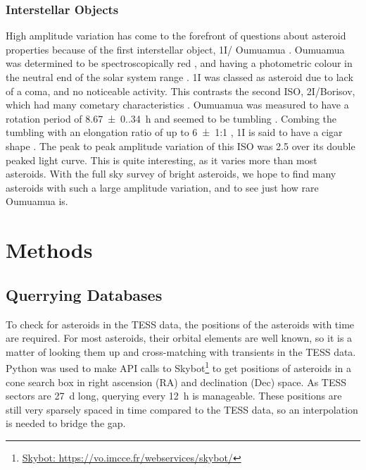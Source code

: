 \documentclass[12pt]{article}
\DeclareRobustCommand{\okina}{%
  \raisebox{\dimexpr\fontcharht\font`A-\height}{%
    \scalebox{0.8}{`}%
  }%
}
\newcommand{\omuamua}{\okina Oumuamua }
\begin{document}
\subsubsection*{Interstellar Objects}
High amplitude variation has come to the forefront of questions about asteroid properties because of the first interstellar object, 1I/\omuamua \citep[see][for a review]{Bannister2019}.
\omuamua was determined to be spectroscopically red \citep{Fitzsimmons2017, Meech2017}, and having a photometric colour in the neutral end of the solar system range \citep{Bannister2017}.
1I was classed as asteroid due to lack of a coma, and no noticeable activity.
This contrasts the second ISO, 2I/Borisov, which had many cometary characteristics \citep[see ][for a review]{Dorofeeva2023}. %
\omuamua was measured to have a rotation period of \qty{8.67(0.34)}{\hour} \citep{Belton2018} and seemed to be tumbling \citep[e.g.][]{Drahus2018,Fraser2018}.
Combing the tumbling with an elongation ratio of up to \qty{6(1)}{}:1 \citep{McNeill2018}, 1I is said to have a cigar shape \citep{Belton2018}.
The peak to peak amplitude variation of this ISO was \qty{2.5}{\mag} \citep{Meech2017} over its double peaked light curve.
This is quite interesting, as it varies more than most asteroids.
With the full sky survey of bright asteroids, we hope to find many asteroids with such a large amplitude variation, and to see just how rare \omuamua is.


\section{Methods}\label{Sec:Meth}

\subsection{Querrying Databases}\label{SubSec:Querry}

To check for asteroids in the TESS data, the positions of the asteroids with time are required.
For most asteroids, their orbital elements are well known, so it is a matter of looking them up and cross-matching with transients in the TESS data.
Python was used to make API calls to {Skybot}\footnote{\href{https://vo.imcce.fr/webservices/skybot/}{Skybot: https://vo.imcce.fr/webservices/skybot/}} to get positions of asteroids in a cone search box in right ascension (RA) and  declination (Dec) space.
As TESS sectors are \qty{27}{\day} long, querying every \qty{12}{\hour} is manageable.
These positions are still very sparsely spaced in time compared to the TESS data, so an interpolation is needed to bridge the gap.
\end{document}
